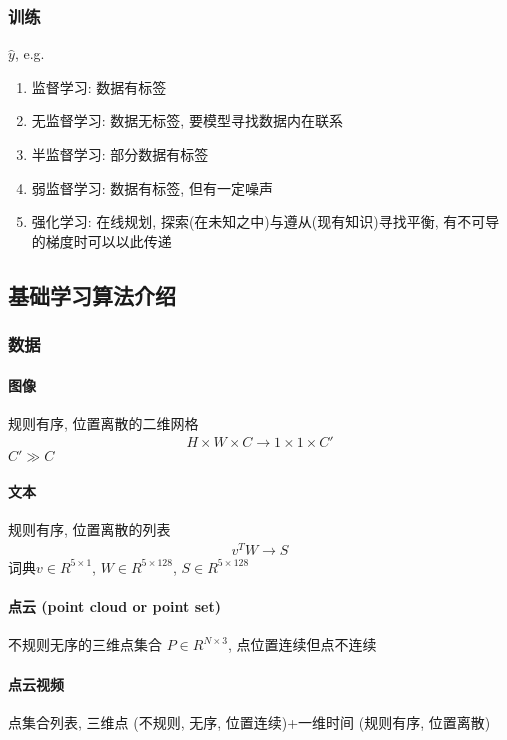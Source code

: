 \subsubsection{训练}
$\hat{y}$, e.g.
\begin{enumerate}
    \item 监督学习: 数据有标签
    \item 无监督学习: 数据无标签, 要模型寻找数据内在联系
    \item 半监督学习: 部分数据有标签
    \item 弱监督学习: 数据有标签, 但有一定噪声
    \item 强化学习: 在线规划, 探索(在未知之中)与遵从(现有知识)寻找平衡, 有不可导的梯度时可以以此传递
\end{enumerate}



\subsection{基础学习算法介绍}
\subsubsection{数据}
\paragraph{图像}
规则有序, 位置离散的二维网格
\begin{align*}
    H\times W\times C \rightarrow 1\times 1\times C'
\end{align*}
$C' \gg C$

\paragraph{文本}
规则有序, 位置离散的列表
\begin{align*}
    v^T W \rightarrow S
\end{align*}
词典$v\in R^{5\times 1}$, $W\in R^{5\times 128}$, $S \in R^{5\times 128}$

\paragraph{点云 (point cloud or point set)}
不规则无序的三维点集合 $P \in R^{N\times 3}$, 点位置连续但点不连续

\paragraph{点云视频}
点集合列表, 三维点 (不规则, 无序, 位置连续)+一维时间 (规则有序, 位置离散)

